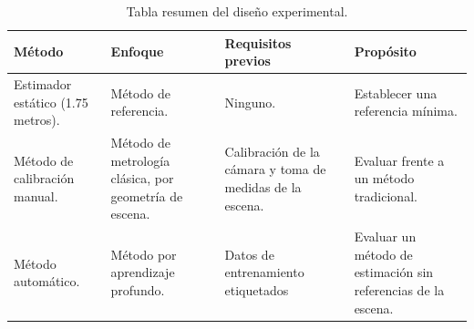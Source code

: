 \begin{table}[!ht]
  \centering
  \scriptsize
  \begin{tabularx}{\linewidth}{|X|X|X|X|}
\hline
\rowcolor[HTML]{FFCB2F}
\textbf{Método} & \textbf{Enfoque} & \textbf{Requisitos previos} & \textbf{Propósito} \\
\hline
Estimador estático (1.75 metros). & Método de referencia. & Ninguno. & Establecer una referencia mínima.\\
\hline
Método de calibración manual. & Método de metrología clásica, por geometría de escena. & Calibración de la cámara y toma de medidas de la escena. & Evaluar frente a un método tradicional. \\
\hline
Método automático. & Método por aprendizaje profundo. & Datos de entrenamiento etiquetados & Evaluar un método de estimación sin referencias de la escena.\\
\hline
\end{tabularx}
\caption[Tabla resumen del diseño experimental.]{
  Tabla resumen del diseño experimental.
}
\label{tab:ExperimentsSummary}
\end{table}


